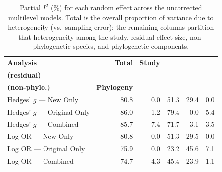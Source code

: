 \begin{table}[htbp]
\centering
\caption{Partial $I^2$ (\%) for each random effect across the uncorrected multilevel models.
Total is the overall proportion of variance due to heterogeneity (vs.\ sampling error);
the remaining columns partition that heterogeneity among the study, residual effect-size,
non-phylogenetic species, and phylogenetic components.}
\label{tab:partial-i2}
\begin{tabular}{@{}lrrrrr@{}}
\toprule
\textbf{Analysis} & \textbf{Total} & \textbf{Study} & \makecell[r]{\textbf{Effect size}\\\textbf{(residual)}} & \makecell[r]{\textbf{Species}\\\textbf{(non-phylo.)}} & \textbf{Phylogeny} \\
\midrule
Hedges' $g$ --- New Only      & 80.8 & 0.0 & 51.3 & 29.4 & 0.0 \\
Hedges' $g$ --- Original Only & 86.0 & 1.2 & 79.4 &  0.0 & 5.4 \\
Hedges' $g$ --- Combined      & 85.7 & 7.4 & 71.7 &  3.1 & 3.5 \\
Log OR --- New Only           & 80.8 & 0.0 & 51.3 & 29.5 & 0.0 \\
Log OR --- Original Only      & 75.9 & 0.0 & 23.2 & 45.6 & 7.1 \\
Log OR --- Combined           & 74.7 & 4.3 & 45.4 & 23.9 & 1.1 \\
\bottomrule
\end{tabular}
\end{table}
